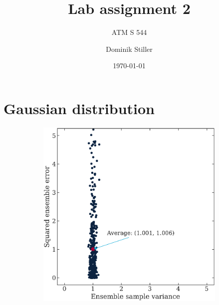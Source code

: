\documentclass[parskip=half,DIV=12,bookmarkpackage=false]{scrartcl}
\title{Lab assignment 2}
\subtitle{ATM S 544}
\author{Dominik Stiller}
\date{\today}
\begin{document}
\maketitle




\section{Gaussian distribution}
\label{sec:gaus}


\begin{figure}[ht]
    \centering
    
    \begin{subfigure}[c]{0.49\textwidth}
        \includegraphics[width=\textwidth]{figures/var_vs_err_1.00.pdf}
        \label{fig:var-1}
    \end{subfigure}
    \hfill
    \begin{subfigure}[c]{0.49\textwidth}

\end{subfigure}
\end{figure}
\end{document}

